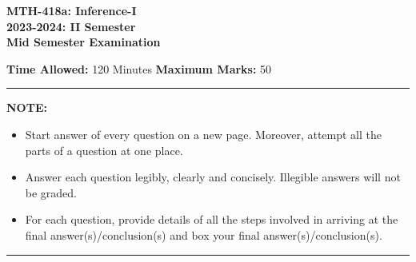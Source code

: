 \documentclass[11pt]{article}
\begin{document}
\begin{center}
    \textbf{MTH-418a: Inference-I} \\
    \textbf{2023-2024: II Semester} \\
    \textbf{Mid Semester Examination}
\end{center}

\noindent \textbf{Time Allowed:} 120 Minutes \hfill \textbf{Maximum Marks:} 50 \\
\rule{\textwidth}{0.4pt}

\noindent \textbf{NOTE:} 
\begin{itemize}
    \item[(i)] Start answer of every question on a new page. Moreover, attempt all the parts of a question at one place.
    \item[(ii)] Answer each question legibly, clearly and concisely. Illegible answers will not be graded.
    \item[(iii)] For each question, provide details of all the steps involved in arriving at the final answer(s)/conclusion(s) and box your final answer(s)/conclusion(s).
\end{itemize}
\rule{\textwidth}{0.4pt}
\end{document}
